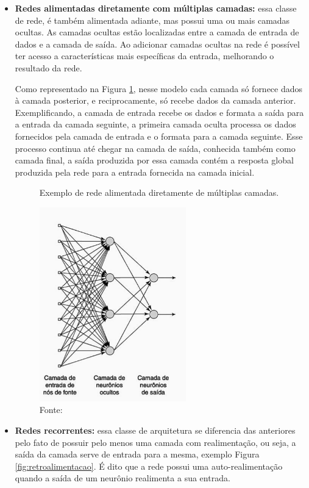 \begin{itemize}
\item \textbf{Redes alimentadas diretamente com múltiplas camadas:} essa classe de rede, é também alimentada adiante, mas possui uma ou mais camadas ocultas. As camadas ocultas estão localizadas entre a camada de entrada de dados e a camada de saída. Ao adicionar camadas ocultas na rede é  possível ter acesso a características mais específicas da entrada, melhorando o resultado da rede.
\par Como representado na Figura \ref{fig:multicamada}, nesse modelo cada camada só fornece dados à camada posterior, e reciprocamente, só recebe dados da camada anterior. Exemplificando, a camada de entrada recebe os dados e formata a saída para a entrada da camada seguinte, a primeira camada oculta processa os dados fornecidos pela camada de entrada e o formata para a camada seguinte. Esse processo continua até chegar na camada de saída, conhecida também como camada final, a saída produzida por essa camada contém a resposta global produzida pela rede para a entrada fornecida na camada inicial.
\begin{figure}[H]
  \centering
  \caption{Exemplo de rede alimentada diretamente de múltiplas camadas.}
  \includegraphics[width=180pt]{dados/figuras/multi_camadas}
  \caption*{Fonte: \cite{haykin2001}}
  \label{fig:multicamada}
\end{figure}
\item \textbf{Redes recorrentes:} essa classe de arquitetura se diferencia das anteriores pelo fato de possuir pelo menos uma camada com realimentação, ou seja, a saída da camada serve de entrada para a mesma, exemplo Figura \ref{fig:retroalimentacao}. É dito que a rede possui uma auto-realimentação quando a saída de um neurônio realimenta a sua entrada.
\begin{figure}[H]

\end{figure}
\end{itemize}
